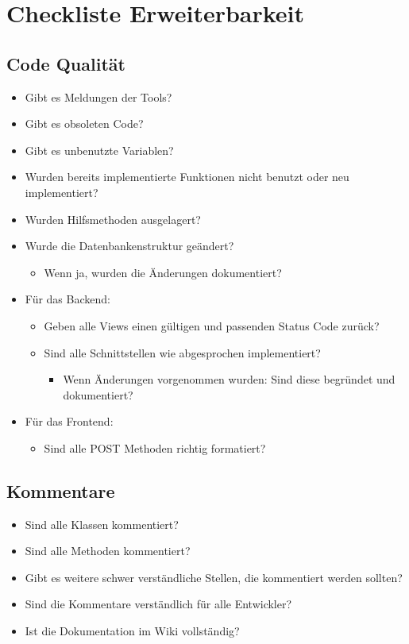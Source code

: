 \documentclass[accentcolor=tud0b,12pt,paper=a4]{tudreport}
\begin{document}
\section{Checkliste Erweiterbarkeit}
\begin{multicols}{2}
	\renewcommand{\labelitemi}{\scriptsize$\square$}	\renewcommand{\labelitemii}{\scriptsize$\square$}
	\renewcommand{\labelitemiii}{\scriptsize$\square$}
	\subsection{Code Qualität}
	\begin{itemize}

		\item Gibt es Meldungen der Tools?
		\item Gibt es obsoleten Code?
		\item Gibt es unbenutzte Variablen?
		\item Wurden bereits implementierte Funktionen nicht benutzt oder neu implementiert?
		\item Wurden Hilfsmethoden ausgelagert?

		\item Wurde die Datenbankenstruktur geändert?
		\begin{itemize}
			\item Wenn ja, wurden die Änderungen dokumentiert?
		\end{itemize}
		\item Für das Backend:
		\begin{itemize}
			\item Geben alle Views einen gültigen und passenden Status Code zurück?
			\item Sind alle Schnittstellen wie abgesprochen implementiert?
		\begin{itemize}
			\item Wenn Änderungen vorgenommen wurden: Sind diese begründet und dokumentiert?
		\end{itemize}
		\end{itemize}
		\item Für das Frontend:
		\begin{itemize}
			\item Sind alle POST Methoden richtig formatiert?
		\end{itemize}
	\end{itemize}
	\subsection{Kommentare}
	\begin{itemize}
		\item Sind alle Klassen kommentiert?
		\item Sind alle Methoden kommentiert?
		\item Gibt es weitere schwer verständliche Stellen, die kommentiert werden sollten?
		\item Sind die Kommentare verständlich für alle Entwickler?
		\item Ist die Dokumentation im Wiki vollständig?
	\end{itemize}


\end{multicols}
\end{document}
